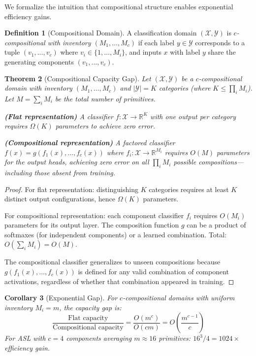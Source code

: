 \documentclass{article}
\newtheorem{theorem}{Theorem}[section]
\newtheorem{corollary}[theorem]{Corollary}
\theoremstyle{definition}
\newtheorem{definition}[theorem]{Definition}
\theoremstyle{remark}
\begin{document}
We formalize the intuition that compositional structure enables exponential efficiency gains.

\begin{definition}[Compositional Domain]
A classification domain $(\mathcal{X}, \mathcal{Y})$ is \textit{$c$-compositional with inventory $(M_1, \ldots, M_c)$} if each label $y \in \mathcal{Y}$ corresponds to a tuple $(v_1, \ldots, v_c)$ where $v_i \in \{1, \ldots, M_i\}$, and inputs $x$ with label $y$ share the generating components $(v_1, \ldots, v_c)$.
\end{definition}

\begin{theorem}[Compositional Capacity Gap]
\label{thm:capacity_gap}
Let $(\mathcal{X}, \mathcal{Y})$ be a $c$-compositional domain with inventory $(M_1, \ldots, M_c)$ and $|\mathcal{Y}| = K$ categories (where $K \leq \prod_i M_i$). Let $M = \sum_i M_i$ be the total number of primitives.

\textbf{(Flat representation)} A classifier $f: \mathcal{X} \to \mathbb{R}^{K}$ with one output per category requires $\Omega(K)$ parameters to achieve zero error.

\textbf{(Compositional representation)} A factored classifier $f(x) = g(f_1(x), \ldots, f_c(x))$ where $f_i: \mathcal{X} \to \mathbb{R}^{M_i}$ requires $O(M)$ parameters for the output heads, achieving zero error on all $\prod_i M_i$ possible compositions---including those absent from training.
\end{theorem}

\begin{proof}
For flat representation: distinguishing $K$ categories requires at least $K$ distinct output configurations, hence $\Omega(K)$ parameters.

For compositional representation: each component classifier $f_i$ requires $O(M_i)$ parameters for its output layer. The composition function $g$ can be a product of softmaxes (for independent components) or a learned combination. Total: $O(\sum_i M_i) = O(M)$.

The compositional classifier generalizes to unseen compositions because $g(f_1(x), \ldots, f_c(x))$ is defined for any valid combination of component activations, regardless of whether that combination appeared in training.
\end{proof}

\begin{corollary}[Exponential Gap]
For $c$-compositional domains with uniform inventory $M_i = m$, the capacity gap is:
\begin{equation}
\frac{\text{Flat capacity}}{\text{Compositional capacity}} = \frac{O(m^c)}{O(cm)} = O\left(\frac{m^{c-1}}{c}\right)
\end{equation}
For ASL with $c=4$ components averaging $m \approx 16$ primitives: $16^3/4 = 1024\times$ efficiency gain.
\end{corollary}
\end{document}
